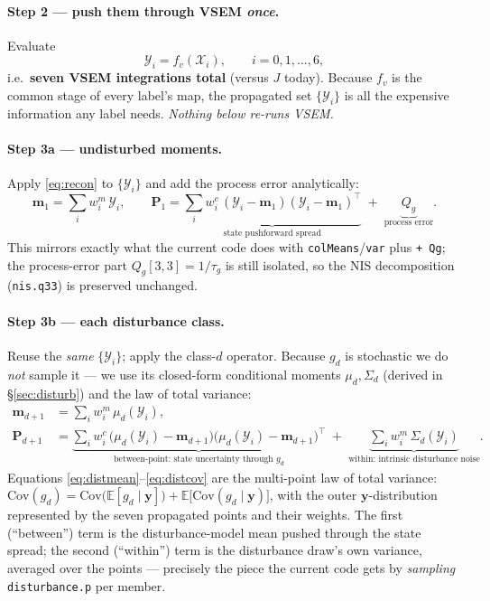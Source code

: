 \documentclass[11pt]{article}
\newcommand{\code}[1]{\texttt{#1}}
\newcommand{\E}{\mathbb{E}}
\newcommand{\Cov}{\mathrm{Cov}}
\newcommand{\by}{\bm{y}}
\newcommand{\bm}[1]{\boldsymbol{#1}}
\begin{document}
\paragraph{Step 2 --- push them through VSEM \emph{once}.} Evaluate
\begin{equation}
\label{eq:propagate}
\mathcal Y_i=f_v(\mathcal X_i),\qquad i=0,1,\dots,6,
\end{equation}
i.e.\ \textbf{seven VSEM integrations total} (versus $J$ today). Because $f_v$ is the
common stage of every label's map, the propagated set $\{\mathcal Y_i\}$ is all the
expensive information any label needs. \emph{Nothing below re-runs VSEM.}

\paragraph{Step 3a --- undisturbed moments.} Apply \eqref{eq:recon} to
$\{\mathcal Y_i\}$ and add the process error analytically:
\begin{equation}
\label{eq:undist}
\bm m_1=\sum_i w_i^m\,\mathcal Y_i,\qquad
\bm P_1=\underbrace{\sum_i w_i^c\,(\mathcal Y_i-\bm m_1)(\mathcal Y_i-\bm m_1)^\top}_{\text{state pushforward spread}}
        \;+\;\underbrace{Q_g}_{\text{process error}} .
\end{equation}
This mirrors exactly what the current code does with \code{colMeans}/\code{var} plus
\code{+ Qg}; the process-error part $Q_g[3,3]=1/\tau_g$ is still isolated, so the NIS
decomposition (\code{nis.q33}) is preserved unchanged.

\paragraph{Step 3b --- each disturbance class.} Reuse the \emph{same}
$\{\mathcal Y_i\}$; apply the class-$d$ operator. Because $g_d$ is stochastic we do
\emph{not} sample it --- we use its closed-form conditional moments $\mu_d,\Sigma_d$
(derived in \S\ref{sec:disturb}) and the law of total variance:
\begin{align}
\bm m_{d+1}&=\sum_i w_i^m\,\mu_d(\mathcal Y_i), \label{eq:distmean}\\
\bm P_{d+1}&=\underbrace{\sum_i w_i^c\,\big(\mu_d(\mathcal Y_i)-\bm m_{d+1}\big)\big(\mu_d(\mathcal Y_i)-\bm m_{d+1}\big)^\top}_{\text{between-point: state uncertainty through }g_d}
            \;+\;\underbrace{\sum_i w_i^m\,\Sigma_d(\mathcal Y_i)}_{\text{within: intrinsic disturbance noise}}. \label{eq:distcov}
\end{align}
Equations \eqref{eq:distmean}--\eqref{eq:distcov} are the multi-point law of total
variance: $\Cov(g_d)=\Cov\big(\E[g_d\mid \by]\big)+\E\big[\Cov(g_d\mid \by)\big]$, with
the outer $\by$-distribution represented by the seven propagated points and their
weights. The first (``between'') term is the disturbance-model mean pushed through the
state spread; the second (``within'') term is the disturbance draw's own variance,
averaged over the points --- precisely the piece the current code gets by \emph{sampling}
\code{disturbance.p} per member.
\end{document}
